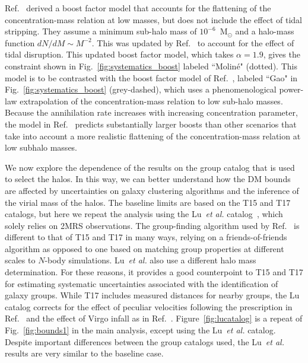 Ref.~\cite{Sanchez-Conde:2013yxa} derived a boost factor model that accounts for the flattening of the concentration-mass relation at low masses, but does not include the effect of tidal stripping.  They assume a minimum sub-halo mass of $10^{-6}$~M$_\odot$ and a halo-mass function $dN/dM \sim M^{-2}$.  This was updated by Ref.~\cite{Moline:2016pbm} to account for the effect of tidal disruption. This updated boost factor model, which takes $\alpha = 1.9$, gives the constraint shown in Fig.~\ref{fig:systematics_boost} labeled ``Molin\'e" (dotted).  This model is to be contrasted with the boost factor model of Ref.~\cite{Gao:2011rf}, labeled ``Gao" in Fig.~\ref{fig:systematics_boost} (grey-dashed), which uses a phenomenological power-law extrapolation of the concentration-mass relation to low sub-halo masses.  Because the annihilation rate increases with increasing concentration parameter, the model in Ref.~\cite{Gao:2011rf} predicts substantially larger boosts than other scenarios that take into account a more realistic flattening of the concentration-mass relation at low subhalo masses.\vspace{0.1in}

We now explore the dependence of the results on the group catalog that is used to select the halos.  In this way, we can better understand how the DM bounds are affected by uncertainties on galaxy clustering algorithms and the inference of the virial mass of the halos.  The baseline limits are based on the T15 and T17 catalogs, but here we repeat the analysis using the Lu~\emph{et al.} catalog~\cite{Lu:2016vmu}, which solely relies on 2MRS observations.  The group-finding algorithm used by Ref.~\cite{Lu:2016vmu} is different to that of T15 and T17 in many ways, relying on a friends-of-friends algorithm as opposed to one based on matching group properties at different scales to $N$-body simulations. Lu~\emph{et al.} also use a different halo mass determination.  For these reasons, it provides a good counterpoint to T15 and T17 for estimating systematic uncertainties associated with the identification of galaxy groups. While T17 includes measured distances for nearby groups, the Lu catalog corrects for the effect of peculiar velocities following the prescription in Ref.~\cite{1996AJ....111..794K} and the effect of Virgo infall as in Ref.~\cite{2014ApJ...782....4K}. Figure~\ref{fig:lucatalog} is a repeat of Fig.~\ref{fig:bounds1} in the main analysis, except using the Lu~\emph{et al.} catalog.  Despite important differences between the group catalogs used, the Lu~\emph{et al.} results are very similar to the baseline case. \\

